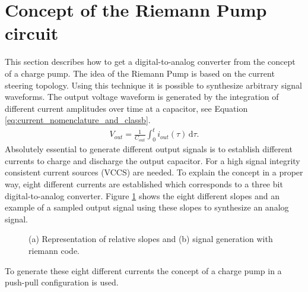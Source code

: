 \documentclass[journal]{IEEEtran}
\begin{document}
\section{Concept of the Riemann Pump circuit}
\label{sec:theory}
%
This section describes how to get %
a digital-to-analog converter from the concept of a charge pump.
The idea of the Riemann Pump %
is based on the current steering topology.
Using this technique it is possible to synthesize arbitrary signal waveforms.
The output voltage waveform is generated by the integration of different current amplitudes over time at a capacitor, see Equation \ref{eq:current_nomenclature_and_classb}.
%
\begin{align}
  V_{out} =  \frac{1}{C_{out}} \int_0^t \! i_{out}(\tau) \, \mathrm{d}\tau.
    \label{eq:current_nomenclature_and_classb}
\end{align}
%
Absolutely essential to generate different output signals is to establish different currents to charge and discharge the output capacitor.
For a high signal integrity consistent current sources (VCCS) are needed.
To explain the concept in a proper way, eight different currents are established which corresponds to a three bit digital-to-analog converter.
Figure \ref{fig:SlopeSynthSignal} shows the eight different slopes and an example of a sampled output signal using these slopes to synthesize an analog signal.
%
\begin{figure}[htb]
  \centering
	\begin{scriptsize}
  	\def\svgwidth{\columnwidth}
 	 
  	\caption{(a) Representation of relative slopes and (b) signal generation with riemann code.}
  	\label{fig:SlopeSynthSignal}
	\end{scriptsize}
\end{figure}
%
To generate these eight different currents the concept of a charge pump in a push-pull configuration is used.
\end{document}
